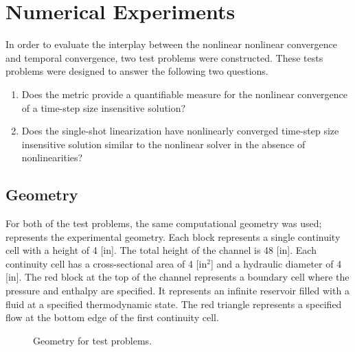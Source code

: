 \section{Numerical Experiments}
\label{sect:numerical_experiments}

In order to evaluate the interplay between the nonlinear nonlinear convergence and temporal convergence, two test problems were constructed.
These tests problems were designed to answer the following two questions.

\begin{enumerate}
\item{Does the metric provide a quantifiable measure for the nonlinear convergence of a time-step size insensitive solution?}
\item{Does the single-shot linearization have nonlinearly converged time-step size insensitive solution similar to the nonlinear solver in the absence of nonlinearities?}
\end{enumerate}

\subsection{Geometry}
\label{subsect:experimental_geometry}
For both of the test problems, the same computational geometry was used;   represents the experimental geometry.
Each block represents a single continuity cell with a height of 4 [in].
The total height of the channel is 48 [in].
Each continuity cell has a cross-sectional area of 4 [in$^2$] and a hydraulic diameter of 4 [in].
The red block at the top of the channel represents a boundary cell where the pressure and enthalpy are specified.
It represents an infinite reservoir filled with a fluid at a specified thermodynamic state.
The red triangle represents a specified flow at the bottom edge of the first continuity cell. 

\begin{figure}[h!t]
\begin{center}
\end{center}
\caption{Geometry for test problems.}
\label{fig:exp_geometry}
\end{figure}

